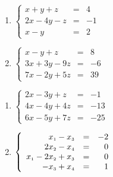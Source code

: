\begin{multicols}{2}
\begin{enumerate}
\setcounter{enumi}{\value{HW}}


\item $\left\{ \begin{array}{rcr} x+y+z & = & 4 \\ 2x-4y-z& = & -1 \\ x-y & = & 2 \end{array} \right.$
\item $\left\{ \begin{array}{rcr} x-y+z & = & 8 \\ 3x+3y-9z & = & -6 \\  7x-2y+5z & = & 39 \end{array} \right.$

\setcounter{HW}{\value{enumi}}
\end{enumerate}
\end{multicols}


\begin{multicols}{2}
\begin{enumerate}
\setcounter{enumi}{\value{HW}}


\item $\left\{ \begin{array}{rcr} 2x-3y+z & = & -1 \\ 4x-4y+4z & = & -13 \\ 6x-5y+7z & = & -25  \end{array} \right.$

\item  $\left\{ \begin{array}{rcr} x_{\mbox{\tiny$1$}} - x_{\mbox{\tiny$3$}} & = & -2 \\ 
2x_{\mbox{\tiny$2$}} - x_{\mbox{\tiny$4$}} & = & 0  \\  
x_{\mbox{\tiny$1$}} -  2x_{\mbox{\tiny$2$}} + x_{\mbox{\tiny$3$}} & = & 0 \\
-x_{\mbox{\tiny$3$}} + x_{\mbox{\tiny$4$}} & = & 1  \end{array} \right.$ \label{solveauglast}

\setcounter{HW}{\value{enumi}}
\end{enumerate}
\end{multicols}



